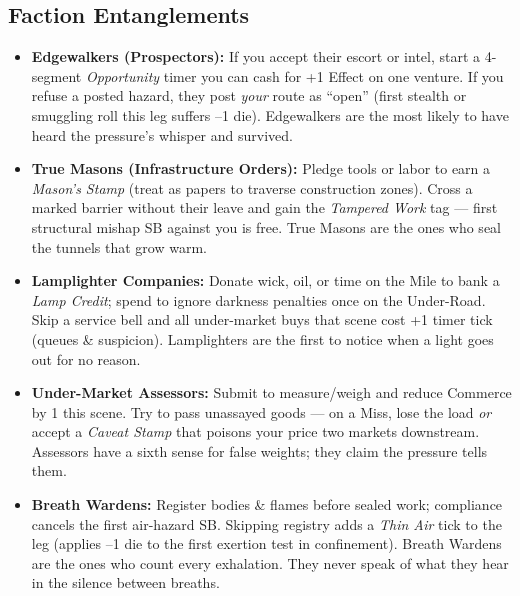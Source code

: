 \subsection*{Faction Entanglements}
\begin{itemize}
  \item \textbf{Edgewalkers (Prospectors):} If you accept their escort or intel, start a 4-segment \emph{Opportunity} timer you can cash for +1 Effect on one venture. If you refuse a posted hazard, they post \emph{your} route as ``open'' (first stealth or smuggling roll this leg suffers --1 die). Edgewalkers are the most likely to have heard the pressure's whisper and survived.
  \item \textbf{True Masons (Infrastructure Orders):} Pledge tools or labor to earn a \emph{Mason's Stamp} (treat as papers to traverse construction zones). Cross a marked barrier without their leave and gain the \emph{Tampered Work} tag --- first structural mishap SB against you is free. True Masons are the ones who seal the tunnels that grow warm.
  \item \textbf{Lamplighter Companies:} Donate wick, oil, or time on the Mile to bank a \emph{Lamp Credit}; spend to ignore darkness penalties once on the Under-Road. Skip a service bell and all under-market buys that scene cost +1 timer tick (queues \& suspicion). Lamplighters are the first to notice when a light goes out for no reason.
  \item \textbf{Under-Market Assessors:} Submit to measure/weigh and reduce Commerce \DV{} by 1 this scene. Try to pass unassayed goods --- on a Miss, lose the load \emph{or} accept a \emph{Caveat Stamp} that poisons your price two markets downstream. Assessors have a sixth sense for false weights; they claim the pressure tells them.
  \item \textbf{Breath Wardens:} Register bodies \& flames before sealed work; compliance cancels the first air-hazard SB. Skipping registry adds a \emph{Thin Air} tick to the leg (applies --1 die to the first exertion test in confinement). Breath Wardens are the ones who count every exhalation. They never speak of what they hear in the silence between breaths.
\end{itemize}

